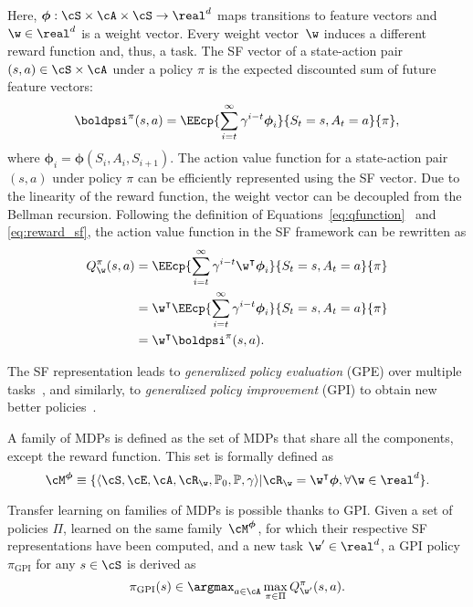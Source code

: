 Here, $\boldsymbol\phi:\cS\times\cA\times\cS\rightarrow\real^{d}$ maps transitions to feature vectors and $\w\in\real^d$ is a weight vector. Every weight vector~$\w$ induces a different reward function and, thus, a task. The SF vector of a state-action pair $(s,a)\in\cS\times\cA$ under a policy $\pi$ is the expected discounted sum of future feature vectors: 
\begin{equation}
  \boldpsi^\pi(s, a) = \EEcp{\sum_{i=t}^\infty \gamma^{i-t} \boldsymbol\phi_i}{S_t = s, A_t = a}{\pi},
  \label{eq:sf}
\end{equation}
where $\boldsymbol\phi_i = \boldsymbol\phi(S_{i}, A_{i}, S_{i+1})$. The action value function for a state-action pair $(s, a)$ under policy $\pi$ can be efficiently represented using the SF vector. Due to the linearity of the reward function, the weight vector can be decoupled from the Bellman recursion. Following the definition of Equations~\eqref{eq:qfunction}~ and \eqref{eq:reward_sf}, the action value function in the SF framework can be rewritten as
\begin{align}
  Q^\pi_\w(s, a) &= \EEcp{\sum_{i=t} ^\infty \gamma^{i-t} \w^\intercal\boldsymbol\phi_i}{S_t = s, A_t = a}{\pi} \nonumber \\
                 & = \w^\intercal\EEcp{\sum_{i=t} ^\infty \gamma^{i-t} \boldsymbol\phi_i}{S_t = s, A_t = a}{\pi} \nonumber \\
                 &=  \w^\intercal \boldpsi^\pi(s, a) .
\label{eq:qfunction_sf}
\end{align}

The SF representation leads to \textit{generalized policy evaluation} (GPE) over multiple tasks~\cite{Barreto2020a}, and similarly, to \textit{generalized policy improvement} (GPI) to obtain new better policies~\cite{Barreto2017}.

A family of MDPs is defined as the set of MDPs that share all the components, except the reward function. This set is formally defined as 
\begin{equation*}
    \cM^{\boldsymbol{\phi}}\equiv\{\langle\cS,\cE,\cA,\cR_\w,\mathbb{P}_0, \mathbb{P},\gamma\rangle \lvert \cR_\w = \w^\intercal \boldsymbol{\phi}, \forall\w\in\real^d\}.
\end{equation*}

Transfer learning on families of MDPs is possible thanks to GPI. Given a set of policies $\Pi$, learned on the same family~$\cM^{\boldsymbol{\phi}}$, for which their respective SF representations have been computed, and a new task $\w'\in\real^d$, a GPI policy $\pi_{\text{GPI}}$ for any $s\in\cS$ is derived as 
\begin{equation}
    \pi_{\text{GPI}}(s) \in \argmax_{a\in\cA} \max_{\pi\in\Pi} Q^\pi_{\w'}(s, a).
    \label{eq:gpi}
\end{equation}

